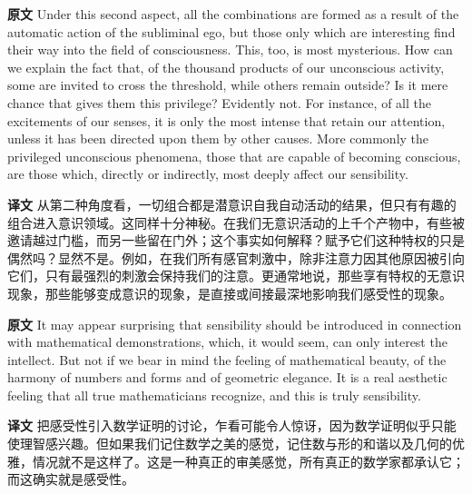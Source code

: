 \documentclass[UTF8]{ctexart}
\newenvironment{english}{\par\small\noindent\textbf{原文}\quad\ignorespaces}{\par}
\newenvironment{zhtranslation}{\par\noindent\textbf{译文}\quad\ignorespaces}{\par\vspace{0.35em}}
\begin{document}
\begin{english}
Under this second aspect, all the combinations are formed as a result of the automatic action of the subliminal ego, but those only which are interesting find their way into the field of consciousness. This, too, is most mysterious. How can we explain the fact that, of the thousand products of our unconscious activity, some are invited to cross the threshold, while others remain outside? Is it mere chance that gives them this privilege? Evidently not. For instance, of all the excitements of our senses, it is only the most intense that retain our attention, unless it has been directed upon them by other causes. More commonly the privileged unconscious phenomena, those that are capable of becoming conscious, are those which, directly or indirectly, most deeply affect our sensibility.
\end{english}
\begin{zhtranslation}
从第二种角度看，一切组合都是潜意识自我自动活动的结果，但只有有趣的组合进入意识领域。这同样十分神秘。在我们无意识活动的上千个产物中，有些被邀请越过门槛，而另一些留在门外；这个事实如何解释？赋予它们这种特权的只是偶然吗？显然不是。例如，在我们所有感官刺激中，除非注意力因其他原因被引向它们，只有最强烈的刺激会保持我们的注意。更通常地说，那些享有特权的无意识现象，那些能够变成意识的现象，是直接或间接最深地影响我们感受性的现象。\end{zhtranslation}

\begin{english}
It may appear surprising that sensibility should be introduced in connection with mathematical demonstrations, which, it would seem, can only interest the intellect. But not if we bear in mind the feeling of mathematical beauty, of the harmony of numbers and forms and of geometric elegance. It is a real aesthetic feeling that all true mathematicians recognize, and this is truly sensibility.
\end{english}
\begin{zhtranslation}
把感受性引入数学证明的讨论，乍看可能令人惊讶，因为数学证明似乎只能使理智感兴趣。但如果我们记住数学之美的感觉，记住数与形的和谐以及几何的优雅，情况就不是这样了。这是一种真正的审美感觉，所有真正的数学家都承认它；而这确实就是感受性。\end{zhtranslation}
\end{document}
